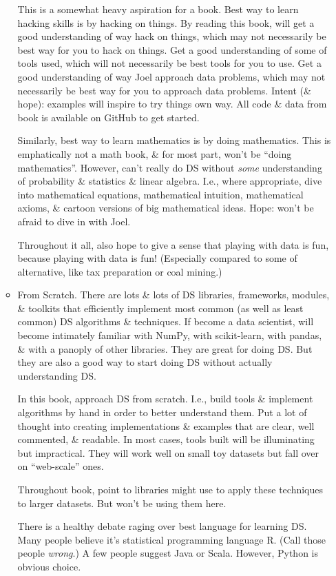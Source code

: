 \documentclass{article}
\begin{document}
\begin{itemize}
\begin{itemize}
		This is a somewhat heavy aspiration for a book. Best way to learn hacking skills is by hacking on things. By reading this book, will get a good understanding of way hack on things, which may not necessarily be best way for you to hack on things. Get a good understanding of some of tools used, which will not necessarily be best tools for you to use. Get a good understanding of way {\sc Joel} approach data problems, which may not necessarily be best way for you to approach data problems. Intent (\& hope): examples will inspire to try things own way. All code \& data from book is available on GitHub to get started.
		
		Similarly, best way to learn mathematics is by doing mathematics. This is emphatically not a math book, \& for most part, won't be ``doing mathematics''. However, can't really do DS without {\it some} understanding of probability \& statistics \& linear algebra. I.e., where appropriate, dive into mathematical equations, mathematical intuition, mathematical axioms, \& cartoon versions of big mathematical ideas. Hope: won't be afraid to dive in with {\sc Joel}.
		
		Throughout it all, also hope to give a sense that playing with data is fun, because playing with data is fun! (Especially compared to some of alternative, like tax preparation or coal mining.)
		\item {\sf From Scratch.} There are lots \& lots of DS libraries, frameworks, modules, \& toolkits that efficiently implement most common (as well as least common) DS algorithms \& techniques. If become a data scientist, will become intimately familiar with NumPy, with scikit-learn, with pandas, \& with a panoply of other libraries. They are great for doing DS. But they are also a good way to start doing DS without actually understanding DS.
		
		In this book, approach DS from scratch. I.e., build tools \& implement algorithms by hand in order to better understand them. Put a lot of thought into creating implementations \& examples that are clear, well commented, \& readable. In most cases, tools built will be illuminating but impractical. They will work well on small toy datasets but fall over on ``web-scale'' ones.
		
		Throughout book, point to libraries might use to apply these techniques to larger datasets. But won't be using them here.
		
		There is a healthy debate raging over best language for learning DS. Many people believe it's statistical programming language R. (Call those people {\it wrong}.) A few people suggest Java or Scala. However, Python is obvious choice.
		

\end{itemize}
\end{itemize}
\end{document}
